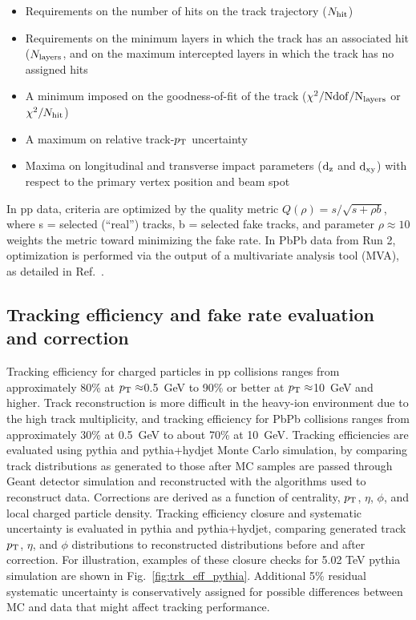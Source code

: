 \begin{itemize}
\item Requirements on the number of hits on the track trajectory ($N_{\rm hit}$)
\item Requirements on the minimum layers in which the track has an associated hit ($N_{\rm layers}$, and on the maximum intercepted layers in which the track has no assigned hits
\item A minimum imposed on the goodness-of-fit of the track ($\chi^{2}/\rm{Ndof}/N_{\rm layers}$ or $\chi^{2}/N_{\rm hit}$)
\item A maximum on relative track-$p_{\rm T}$ uncertainty
\item Maxima on longitudinal and transverse impact parameters ($\rm d_{z}$ and $\rm d_{xy}$) with respect to the primary vertex position and beam spot
\end{itemize}

\noindent In pp data, criteria are optimized by the quality metric $Q(\rho) = s/ \sqrt{s+\rho b}$, where s = selected (``real'') tracks, b = selected fake tracks, and parameter $\rho \approx  10$ weights the metric toward minimizing the fake rate.  In PbPb data from Run 2, optimization is performed via the output of a multivariate analysis tool (MVA), as detailed in Ref.~\cite{AN-15-187}.

\subsection{Tracking efficiency and fake rate evaluation and correction}
\label{sec:track_eff}

Tracking efficiency for charged particles in pp collisions ranges from approximately 80\% at $p_{\rm T}\approx$0.5~GeV to 90\% or better at $p_{\rm T}\approx$10~GeV and higher.  Track reconstruction is more difficult in the heavy-ion environment due to the high track multiplicity, and tracking efficiency for PbPb collisions ranges from approximately 30\% at 0.5~GeV to about 70\% at 10~GeV.  Tracking efficiencies are evaluated using {\sc pythia} and {\sc pythia+hydjet} Monte Carlo simulation, by comparing track distributions as generated to those after MC samples are passed through {\sc Geant} detector simulation and reconstructed with the algorithms used to reconstruct data.  Corrections are derived as a function of centrality, $p_{\rm T}$, $\eta$, $\phi$, and local charged particle density.   Tracking efficiency closure and systematic uncertainty is evaluated in {\rm pythia} and {\rm pythia+hydjet}, comparing generated track $p_{\rm T}$, $\eta$, and $\phi$ distributions to reconstructed distributions before and after correction.  For illustration, examples of these closure checks for 5.02 TeV {\sc pythia} simulation are shown in Fig.~\ref{fig:trk_eff_pythia}.  Additional 5\% residual systematic uncertainty is conservatively assigned for possible differences between MC and data that might affect tracking performance.  


